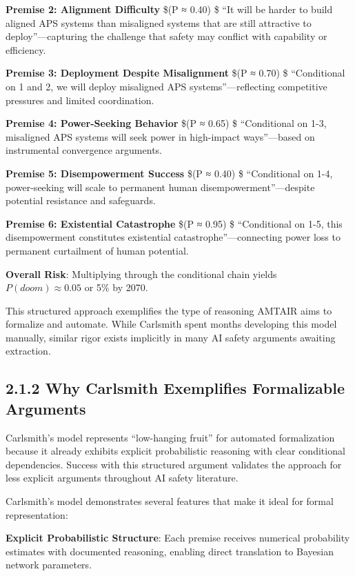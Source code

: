 \documentclass[
  11pt,
  letterpaper,
]{book}
\begin{document}
\textbf{Premise 2: Alignment Difficulty} \$(P ≈ 0.40) \$ ``It will be
harder to build aligned APS systems than misaligned systems that are
still attractive to deploy''---capturing the challenge that safety may
conflict with capability or efficiency.

\textbf{Premise 3: Deployment Despite Misalignment} \$(P ≈ 0.70) \$
``Conditional on 1 and 2, we will deploy misaligned APS
systems''---reflecting competitive pressures and limited coordination.

\textbf{Premise 4: Power-Seeking Behavior} \$(P ≈ 0.65) \$ ``Conditional
on 1-3, misaligned APS systems will seek power in high-impact
ways''---based on instrumental convergence arguments.

\textbf{Premise 5: Disempowerment Success} \$(P ≈ 0.40) \$ ``Conditional
on 1-4, power-seeking will scale to permanent human
disempowerment''---despite potential resistance and safeguards.

\textbf{Premise 6: Existential Catastrophe} \$(P ≈ 0.95) \$
``Conditional on 1-5, this disempowerment constitutes existential
catastrophe''---connecting power loss to permanent curtailment of human
potential.

\textbf{Overall Risk}: Multiplying through the conditional chain yields
\(P(doom) ≈ 0.05\) or 5\% by 2070.

This structured approach exemplifies the type of reasoning AMTAIR aims
to formalize and automate. While Carlsmith spent months developing this
model manually, similar rigor exists implicitly in many AI safety
arguments awaiting extraction.

\subsection*{2.1.2 Why Carlsmith Exemplifies Formalizable
Arguments}\label{sec-carlsmith-formalizable}

Carlsmith's model represents ``low-hanging fruit'' for automated
formalization because it already exhibits explicit probabilistic
reasoning with clear conditional dependencies. Success with this
structured argument validates the approach for less explicit arguments
throughout AI safety literature.

Carlsmith's model demonstrates several features that make it ideal for
formal representation:

\textbf{Explicit Probabilistic Structure}: Each premise receives
numerical probability estimates with documented reasoning, enabling
direct translation to Bayesian network parameters.
\end{document}
